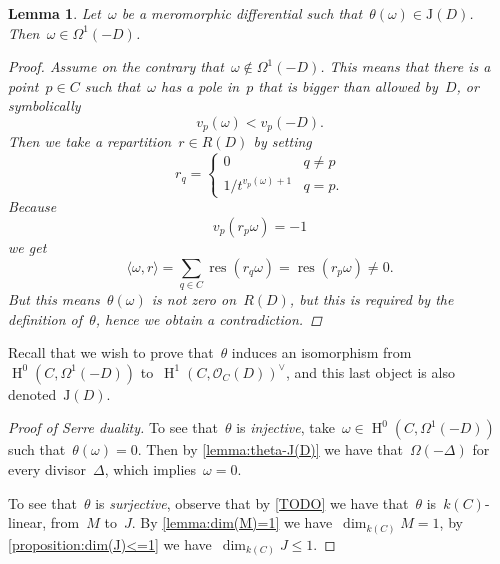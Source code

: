 \documentclass[10pt,a4paper]{article}
\theoremstyle{lecture}
\newtheorem{lemma}[theorem]{Lemma}
\newcommand\dash{\nobreakdash-\hspace{0pt}}
\DeclareMathOperator\HH{H}
\DeclareMathOperator\res{res}
\begin{document}
\begin{lemma}
  \label{lemma:TODO}
  Let~$\omega$ be a meromorphic differential such that~$\theta(\omega)\in\mathrm{J}(D)$. Then~$\omega\in\Omega^1(-D)$.

  \begin{proof}
    Assume on the contrary that~$\omega\notin\Omega^1(-D)$. This means that there is a point~$p\in C$ such that~$\omega$ has a pole in~$p$ that is bigger than allowed by~$D$, or symbolically
    \begin{equation}
      v_p(\omega)<v_p(-D).
    \end{equation}
    Then we take a repartition~$r\in R(D)$ by setting
    \begin{equation}
      r_q=
      \begin{cases}
        0 & q\neq p \\
        1/t^{v_p(\omega)+1} & q=p.
      \end{cases}
    \end{equation}
    Because
    \begin{equation}
      v_p(r_p\omega)=-1
    \end{equation}
    we get
    \begin{equation}
      \langle\omega,r\rangle=\sum_{q\in C}\res(r_q\omega)=\res(r_p\omega)\neq 0.
    \end{equation}
    But this means~$\theta(\omega)$ is not zero on~$R(D)$, but this is required by the definition of~$\theta$, hence we obtain a contradiction.
  \end{proof}
\end{lemma}

Recall that we wish to prove that~$\theta$ induces an isomorphism from~$\HH^0(C,\Omega^1(-D))$ to~$\HH^1(C,\mathcal{O}_C(D))^\vee$, and this last object is also denoted~$\mathrm{J}(D)$.
\begin{proof}[Proof of Serre duality]
  To see that~$\theta$ is \emph{injective}, take~$\omega\in\HH^0(C,\Omega^1(-D))$ such that~$\theta(\omega)=0$. Then by \cref{lemma:theta-J(D)} we have that~$\Omega(-\Delta)$ for every divisor~$\Delta$, which implies~$\omega=0$\expand.

  To see that~$\theta$ is \emph{surjective}, observe that by \cref{TODO} we have that~$\theta$ is~$k(C)$\dash linear, from~$M$ to~$J$. By \cref{lemma:dim(M)=1} we have~$\dim_{k(C)}M=1$, by \cref{proposition:dim(J)<=1} we have~$\dim_{k(C)}J\leq 1$.
\end{proof}
\end{document}
